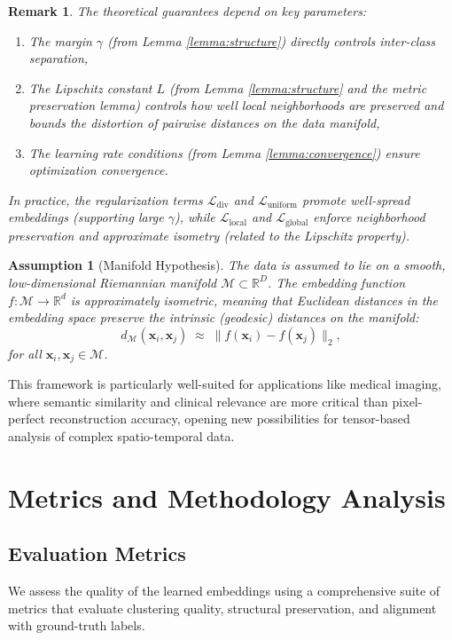 \documentclass[a4paper,12pt,reqno]{amsart}
\newtheorem{remark}[theorem]{\textbf{Remark}}
\newtheorem{assumption}[theorem]{\textbf{Assumption}}
\theoremstyle{definition}
\theoremstyle{remark}
\begin{document}
\begin{remark}
		The theoretical guarantees depend on key parameters:
		\begin{enumerate}[label=(\roman*)]
			\item The margin $\gamma$ (from Lemma \ref{lemma:structure}) directly controls inter-class separation,
			\item The Lipschitz constant $L$ (from Lemma \ref{lemma:structure} and the metric preservation lemma) controls how well local neighborhoods are preserved and bounds the distortion of pairwise distances on the data manifold,
			\item The learning rate conditions (from Lemma \ref{lemma:convergence}) ensure optimization convergence.
		\end{enumerate}
In practice, the regularization terms $\mathcal{L}_{\text{div}}$ and $\mathcal{L}_{\text{uniform}}$ promote well-spread embeddings (supporting large $\gamma$), while $\mathcal{L}_{\text{local}}$ and $\mathcal{L}_{\text{global}}$ enforce neighborhood preservation and approximate isometry (related to the Lipschitz property).
	\end{remark}
\begin{assumption}[Manifold Hypothesis]
	The data is assumed to lie on a smooth, low-dimensional Riemannian manifold $\mathcal{M} \subset \mathbb{R}^D$. 
	The embedding function $f: \mathcal{M} \to \mathbb{R}^d$ is approximately isometric, meaning that Euclidean distances in the embedding space preserve the intrinsic (geodesic) distances on the manifold:
	\begin{equation}
		d_{\mathcal{M}}(\mathbf{x}_i, \mathbf{x}_j) \;\approx\; \|f(\mathbf{x}_i) - f(\mathbf{x}_j)\|_2,
	\end{equation}
	for all $\mathbf{x}_i, \mathbf{x}_j \in \mathcal{M}$.
\end{assumption}
This framework is particularly well-suited for applications like medical imaging, where semantic similarity and clinical relevance are more critical than pixel-perfect reconstruction accuracy, opening new possibilities for tensor-based analysis of complex spatio-temporal data.



\section{Metrics and Methodology Analysis}\label{sec:metric}

\subsection{Evaluation Metrics}\label{subsec:em}
We assess the quality of the learned embeddings using a comprehensive suite of metrics that evaluate clustering quality, structural preservation, and alignment with ground-truth labels.
\end{document}

